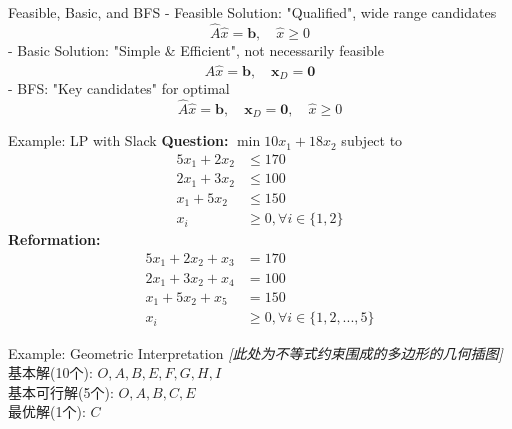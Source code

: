\documentclass[aspectratio=169,hyperref,UTF8,CJK]{beamer}
\begin{document}
\begin{frame}{Feasible, Basic, and BFS}
- Feasible Solution: "Qualified", wide range candidates
\[
\hat{A}\hat{x} = \mathbf{b}, \quad \hat{x}\geq 0
\]
- Basic Solution: "Simple \& Efficient", not necessarily feasible
\[
\hat{A}\hat{x} = \mathbf{b}, \quad \mathbf{x}_D = \mathbf{0}
\]
- BFS: "Key candidates" for optimal
\[
\hat{A}\hat{x} = \mathbf{b}, \quad \mathbf{x}_D = \mathbf{0}, \quad \hat{x}\geq 0
\]
\end{frame}

\begin{frame}{Example: LP with Slack}
\textbf{Question:} \(\min 10x_1 + 18x_2\) subject to
\begin{align*}
5x_1 + 2x_2 &\leq 170 \\
2x_1 + 3x_2 &\leq 100 \\
x_1 + 5x_2 &\leq 150 \\
x_i &\geq 0, \forall i \in \{1, 2\}
\end{align*}
\textbf{Reformation:}
\begin{align*}
5x_1 + 2x_2 + x_3 &= 170 \\
2x_1 + 3x_2 + x_4 &= 100 \\
x_1 + 5x_2 + x_5 &= 150 \\
x_i &\geq 0, \forall i \in \{1, 2, ..., 5\}
\end{align*}
\end{frame}

\begin{frame}{Example: Geometric Interpretation}
\textit{[此处为不等式约束围成的多边形的几何插图]}
基本解(10个): \(O, A, B, E, F, G, H, I\) \\
基本可行解(5个): \(O, A, B, C, E\) \\
最优解(1个): \(C\)
\end{frame}
\end{document}
